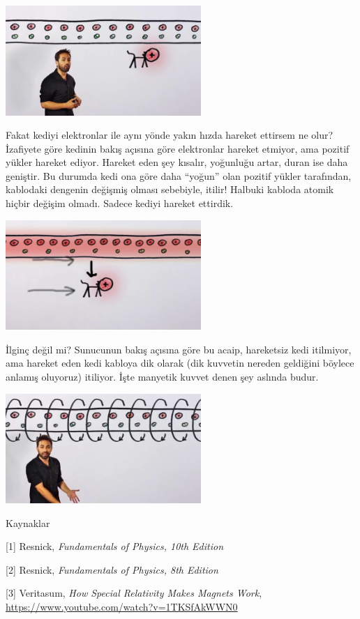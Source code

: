 \documentclass[12pt,fleqn]{article}\usepackage{../../common}
\begin{document}
\includegraphics[width=20em]{19_04.jpg}

Fakat kediyi elektronlar ile aynı yönde yakın hızda hareket ettirsem ne olur?
İzafiyete göre kedinin bakış açısına göre elektronlar hareket etmiyor, ama
pozitif yükler hareket ediyor. Hareket eden şey kısalır, yoğunluğu artar,
duran ise daha geniştir. Bu durumda kedi ona göre daha ``yoğun'' olan pozitif
yükler tarafından, kablodaki dengenin değişmiş olması sebebiyle, itilir! Halbuki
kabloda atomik hiçbir değişim olmadı. Sadece kediyi hareket ettirdik. 

\includegraphics[width=20em]{19_05.jpg}

İlginç değil mi? Sunucunun bakış açısına göre bu acaip, hareketsiz kedi
itilmiyor, ama hareket eden kedi kabloya dik olarak (dik kuvvetin nereden
geldiğini böylece anlamış oluyoruz) itiliyor. İşte manyetik kuvvet denen şey
aslında budur.

\includegraphics[width=20em]{19_06.jpg}




Kaynaklar

[1] Resnick, {\em Fundamentals of Physics, 10th Edition}

[2] Resnick, {\em Fundamentals of Physics, 8th Edition}

[3] Veritasum, {\em How Special Relativity Makes Magnets Work},
    \url{https://www.youtube.com/watch?v=1TKSfAkWWN0}
\end{document}
